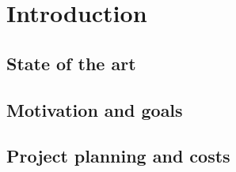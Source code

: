 \chapter{Introduction}
\section{State of the art}

\section{Motivation and goals}

\section{Project planning and costs}
